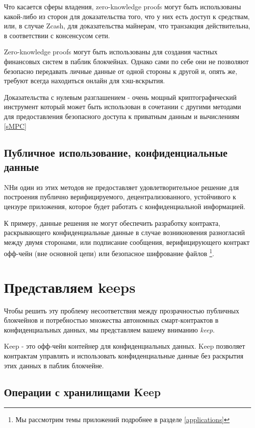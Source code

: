 \documentclass[11pt]{article}
\begin{document}
Что касается сферы владения, zero-knowledge proofs могут быть 
использованы какой-либо из сторон для доказательства того, что 
у них есть доступ к средствам, или, в случае Zcash, для 
доказательства майнерам, что транзакция действительна, в соответствии 
с консенсусом сети.

Zero-knowledge proofs могут быть использованы для создания частных 
финансовых систем в паблик блокчейнах. Однако сами по себе они не 
позволяют безопасно передавать личные данные от одной стороны к 
другой и, опять же, требуют всегда находиться онлайн для хэш-вскрытия.

Доказательства с нулевым разглашением - очень мощный криптографический 
инструмент который может быть использован в сочетании с другими 
методами для предоставления безопасного доступа к приватным данным 
и вычислениям \ref{sMPC}

\subsection{Публичное использование, конфиденциальные данные}

NНи один из этих методов не предоставляет удовлетворительное 
решение для построения публично верифицируемого, децентрализованного, 
устойчивого к цензуре приложения, которое будет работать с 
конфиденциальной информацией.

К примеру, данные решения не могут обеспечить разработку контракта, 
раскрывающего конфиденциальные данные в случае возникновения 
разногласий между двумя сторонами, или подписание сообщения, 
верифицирующего контракт офф-чейн (вне основной цепи) или безопасное
шифрование файлов \footnote{Мы рассмотрим темы приложений подробнее 
в разделе \ref{applications}}.

\section{Представляем keeps}

Чтобы решить эту проблему несоответствия между прозрачностью публичных 
блокчейнов и потребностью множества автономных смарт-контрактов в 
конфиденциальных данных, мы представляем вашему вниманию {\em keep}.

Keep - это офф-чейн контейнер для конфиденциальных данных. Keep 
позволяет контрактам управлять и использовать конфиденциальные данные 
без раскрытия этих данных в паблик блокчейне.

\subsection{Операции с хранилищами Keep}
\end{document}
